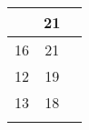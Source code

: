 {\begin{tabularx}{\textwidth}{p{.1em}cc}
\begin{tabular}[t]{cc}
\multicolumn{1}{|c|}{15}                                                        & \multicolumn{1}{c|}{21}                                                             \\ \hline
\multicolumn{1}{|c|}{16}                                                        & \multicolumn{1}{c|}{21}                                                             \\ \hline
\multicolumn{1}{|c|}{12}                                                        & \multicolumn{1}{c|}{19}                                                             \\ \hline
\multicolumn{1}{|c|}{13}                                                        & \multicolumn{1}{c|}{18}                                                             \\ \hline
\end{tabular}

\end{tabularx}}